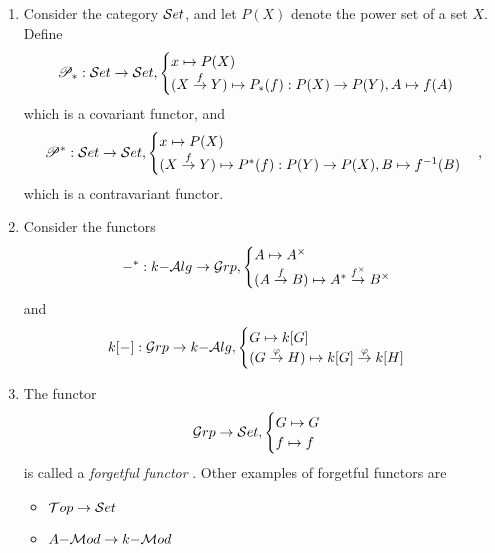 \begin{bsp}\label{5:funcexe}
  \begin{enumerate}
    \item Consider the category $\mathcal{S}et$, and let $P(X)$ denote the power set of a set $X$. Define
    \[
    \mathscr{P}_{\ast}: \mathcal{S}et \to \mathcal{S}et, \begin{cases}x\mapsto P(X)\\ (X\overset{f}{\to}Y)\mapsto P_{\ast}(f): P(X)\to P(Y),A\mapsto f(A)\end{cases}
    \]
    which is a covariant functor, and
    \[
    \mathscr{P}^{\ast}: \mathcal{S}et \to \mathcal{S}et, \begin{cases}x\mapsto P(X)\\ (X\overset{f}{\to}Y)\mapsto P^{\ast}(f): P(Y)\to P(X),B\mapsto f^{-1}(B)\end{cases},
    \]
    which is a contravariant functor.
    \item Consider the functors
    \[
    \mathrm{-}^{\ast}: k\mathrm{-} \mathcal{A}lg \to \mathcal{G}rp, \begin{cases}A\mapsto A^{\times}\\ (A\overset{f}{\to}B)\mapsto A^{\ast}\overset{f^{\times}}{\to}B^{\times}\end{cases}
    \] and
    \[
    k[\mathrm{-}]:\mathcal{G}rp\to k\mathrm{-}\mathcal{A}lg, \begin{cases}G\mapsto k[G]\\(G\overset{\varphi}{\to}H)\mapsto k[G]\overset{\varphi}{\to}k[H]\end{cases}
    \]
    \item The functor
    \[
    \mathcal{G}rp\to \mathcal{S}et,\begin{cases}G\mapsto G\\f\mapsto f\end{cases}\]
    is called a \emph{forgetful functor} . Other examples of forgetful functors are
    \begin{itemize}
      \item $\mathcal{T}op\to \mathcal{S}et$
      \item $A\mathrm{-}\mathcal{M}od\to k\mathrm{-}\mathcal{M}od$
    \end{itemize}
  \end{enumerate}
\end{bsp}

